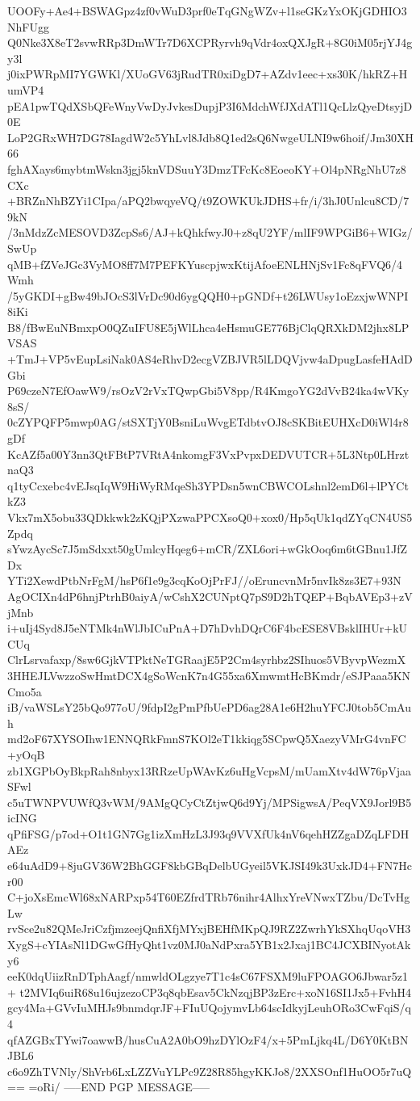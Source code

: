 UOOFy+Ae4+BSWAGpz4zf0vWuD3prf0eTqGNgWZv+l1seGKzYxOKjGDHIO3NhFUgg
Q0Nke3X8eT2svwRRp3DmWTr7D6XCPRyrvh9qVdr4oxQXJgR+8G0iM05rjYJ4gy3l
j0ixPWRpMI7YGWKl/XUoGV63jRudTR0xiDgD7+AZdv1eec+xs30K/hkRZ+HumVP4
pEA1pwTQdXSbQFeWnyVwDyJvkesDupjP3I6MdchWfJXdATl1QcLlzQyeDtsyjD0E
LoP2GRxWH7DG78IagdW2c5YhLvl8Jdb8Q1ed2sQ6NwgeULNI9w6hoif/Jm30XH66
fghAXays6mybtmWskn3jgj5knVDSuuY3DmzTFcKc8EoeoKY+Ol4pNRgNhU7z8CXc
+BRZnNhBZYi1CIpa/aPQ2bwqyeVQ/t9ZOWKUkJDHS+fr/i/3hJ0Unlcu8CD/79kN
/3nMdzZcMESOVD3ZcpSs6/AJ+kQhkfwyJ0+z8qU2YF/mlIF9WPGiB6+WIGz/SwUp
qMB+fZVeJGc3VyMO8ff7M7PEFKYuscpjwxKtijAfoeENLHNjSv1Fc8qFVQ6/4Wmh
/5yGKDI+gBw49bJOcS3lVrDc90d6ygQQH0+pGNDf+t26LWUsy1oEzxjwWNPI8iKi
B8/fBwEuNBmxpO0QZuIFU8E5jWlLhca4eHsmuGE776BjClqQRXkDM2jhx8LPVSAS
+TmJ+VP5vEupLsiNak0AS4eRhvD2ecgVZBJVR5lLDQVjvw4aDpugLasfeHAdDGbi
P69czeN7EfOawW9/rsOzV2rVxTQwpGbi5V8pp/R4KmgoYG2dVvB24ka4wVKy8sS/
0cZYPQFP5mwp0AG/stSXTjY0BsniLuWvgETdbtvOJ8cSKBitEUHXcD0iWl4r8gDf
KcAZf5a00Y3nn3QtFBtP7VRtA4nkomgF3VxPvpxDEDVUTCR+5L3Ntp0LHrztnaQ3
q1tyCcxebc4vEJsqIqW9HiWyRMqeSh3YPDsn5wnCBWCOLshnl2emD6l+lPYCtkZ3
Vkx7mX5obu33QDkkwk2zKQjPXzwaPPCXsoQ0+xox0/Hp5qUk1qdZYqCN4US5Zpdq
sYwzAycSc7J5mSdxxt50gUmlcyHqeg6+mCR/ZXL6ori+wGkOoq6m6tGBnu1JfZDx
YTi2XewdPtbNrFgM/hsP6f1e9g3cqKoOjPrFJ//oEruncvnMr5nvIk8zs3E7+93N
AgOCIXn4dP6hnjPtrhB0aiyA/wCshX2CUNptQ7pS9D2hTQEP+BqbAVEp3+zVjMnb
i+uIj4Syd8J5eNTMk4nWlJbICuPnA+D7hDvhDQrC6F4bcESE8VBsklIHUr+kUCUq
ClrLsrvafaxp/8sw6GjkVTPktNeTGRaajE5P2Cm4syrhbz2SIhuos5VByvpWezmX
3HHEJLVwzzoSwHmtDCX4gSoWcnK7n4G55xa6XmwmtHcBKmdr/eSJPaaa5KNCmo5a
iB/vaWSLsY25bQo977oU/9fdpI2gPmPfbUePD6ag28A1e6H2huYFCJ0tob5CmAuh
md2oF67XYSOIhw1ENNQRkFmnS7KOl2eT1kkiqg5SCpwQ5XaezyVMrG4vnFC+yOqB
zb1XGPbOyBkpRah8nbyx13RRzeUpWAvKz6uHgVcpsM/mUamXtv4dW76pVjaaSFwl
c5uTWNPVUWfQ3vWM/9AMgQCyCtZtjwQ6d9Yj/MPSigwsA/PeqVX9Jorl9B5icING
qPfiFSG/p7od+O1t1GN7Gg1izXmHzL3J93q9VVXfUk4nV6qehHZZgaDZqLFDHAEz
e64uAdD9+8juGV36W2BhGGF8kbGBqDelbUGyeil5VKJSI49k3UxkJD4+FN7Hcr00
C+joXsEmcWl68xNARPxp54T60EZfrdTRb76nihr4AlhxYreVNwxTZbu/DcTvHgLw
rvSce2u82QMeJriCzfjmzeejQnfiXfjMYxjBEHfMKpQJ9RZ2ZwrhYkSXhqUqoVH3
XygS+cYIAsNl1DGwGfHyQht1vz0MJ0aNdPxra5YB1x2Jxaj1BC4JCXBINyotAky6
eeK0dqUiizRnDTphAagf/nmwldOLgzye7T1c4sC67FSXM9luFPOAGO6Jbwar5z1+
t2MVIq6uiR68u16ujzezoCP3q8qbEsav5CkNzqjBP3zErc+xoN16SI1Jx5+FvhH4
gcy4Ma+GVvIuMHJs9bnmdqrJF+FIuUQojymvLb64scIdkyjLeuhORo3CwFqiS/q4
qfAZGBxTYwi7oawwB/husCuA2A0bO9hzDYlOzF4/x+5PmLjkq4L/D6Y0KtBNJBL6
c6o9ZhTVNly/ShVrb6LxLZZVuYLPc9Z28R85hgyKKJo8/2XXSOnf1HuOO5r7uQ==
=oRi/
-----END PGP MESSAGE-----

